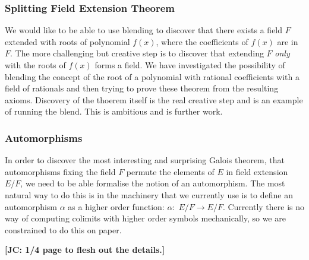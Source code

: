 \subsubsection{Splitting Field Extension Theorem}

We would like to be able to use blending to discover that there exists a
field $F$ extended with roots of polynomial $f(x)$, where the coefficients of $f(x)$ are in $F$. The more challenging but creative step is to discover that extending $F$ {\em only} with the roots of $f(x)$ forms a field. We have investigated the possibility of blending the concept of the root of a polynomial with rational coefficients with a field of rationals and then trying to prove these theorem from the resulting axioms. Discovery of the thoerem itself is the real creative step and is an example of running the blend. This is ambitious and is further work.

\subsubsection{Automorphisms}

In order to discover the most interesting and surprising Galois
theorem, that automorphisms fixing the field $F$ permute the elements
of $E$ in field extension $E/F$, we need to be able formalise the
notion of an automorphism. The most natural way to do this is in the
machinery that we currently use is to define an automorphism $\alpha$
as a higher order function: $\alpha:\; E/F \to E/F$. Currently there
is no way of computing colimits with higher order symbols
mechanically, so we are constrained to do this on paper.


\textbf{[JC: 1/4 page to flesh out the details.]}
\newpage

